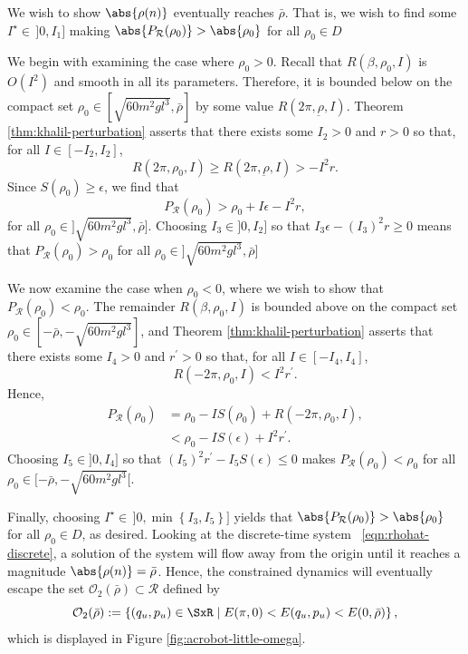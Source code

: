 We wish to show \(\abs{\rho(n)}\) eventually reaches \(\bar{\rho}\).
That is, we wish to find some \(I^\star \in \,]0,I_1]\) making
\(\abs{P_\mathcal{R}(\rho_0)} > \abs{\rho_0}\) for all 
\(\rho_0 \in D\)

We begin with examining the case where \(\rho_0 > 0\).
Recall that \(R(\beta,\rho_0,I)\) is \(O(I^2)\) and smooth in all
its parameters.
Therefore, it is bounded below on the compact set
\(\rho_0 \in [\sqrt{60m^2gl^3},\bar{\rho}]\) by some value
\(R(2\pi,\underbar{\rho},I)\).
Theorem \ref{thm:khalil-perturbation} asserts that there exists some 
\(I_2 > 0\) and \(r > 0\) so that, for all \(I \in [-I_2,I_2]\),
\[
    R(2\pi,\rho_0,I) \geq R(2\pi,\underbar{\rho},I) > -I^2r
    .
\]
Since \(S(\rho_0) \geq \epsilon\), we find that
\[
    P_\mathcal{R}(\rho_0) > \rho_0 + I\epsilon -I^2r
    ,
\]
for all \(\rho_0 \in ]\sqrt{60m^2gl^3},\bar{\rho}]\).
Choosing \(I_3 \in ]0,I_2]\) so that 
\(I_3\epsilon - (I_3)^2 r \geq 0\) means that
\(P_\mathcal{R}(\rho_0) > \rho_0\)
for all \(\rho_0 \in ]\sqrt{60m^2gl^3},\bar{\rho}]\)

We now examine the case when \(\rho_0 < 0\), where we wish to show that 
\(P_\mathcal{R}(\rho_0) < \rho_0\).
The remainder \(R(\beta,\rho_0,I)\) is bounded above on the compact set 
\(\rho_0 \in [-\bar{\rho},-\sqrt{60m^2gl^3}]\), and 
Theorem \ref{thm:khalil-perturbation} asserts that there exists some 
\(I_4 > 0\) and \(r^\prime > 0\) so that, for all \(I \in [-I_4,I_4]\), 
\[
    R(-2\pi,\rho_0,I) < I^2 r^\prime
    .
\]
Hence,
\begin{align*}
    P_\mathcal{R}(\rho_0)
    &= \rho_0 - IS(\rho_0) + R(-2\pi,\rho_0,I)
    , \\
    &< \rho_0 - IS(\epsilon) + I^2r^\prime
    .
\end{align*}
Choosing \(I_5 \in ]0,I_4]\) so that 
\((I_5)^2r^\prime - I_5 S(\epsilon) \leq 0\) makes
\(P_\mathcal{R}(\rho_0) < \rho_0\) for all 
\(\rho_0 \in [-\bar{\rho},-\sqrt{60m^2gl^3}[\).

Finally, choosing \(I^\star \in\, ]0,\min\left\{I_3,I_5\right\}]\) yields that
\(\abs{P_\mathcal{R}(\rho_0)} > \abs{\rho_0}\) for all \(\rho_0 \in D\), as
desired.
Looking at the discrete-time system ~\eqref{eqn:rhohat-discrete}, 
a solution of the system will flow away from the origin until it reaches a
magnitude \(\abs{\rho(n)} = \bar{\rho}\).
Hence, the constrained dynamics will eventually escape the set
\(\mathcal{O}_2(\bar{\rho}) \subset \mathcal{R}\) defined by
\[
    \mathcal{O}_2(\bar{\rho}) := \left\{(q_u,p_u) \in \SxR
    \mid E(\pi,0) < E(q_u,p_u) < E(0,\bar{\rho}) \right\}
    ,
\]
which is displayed in Figure \ref{fig:acrobot-little-omega}.

